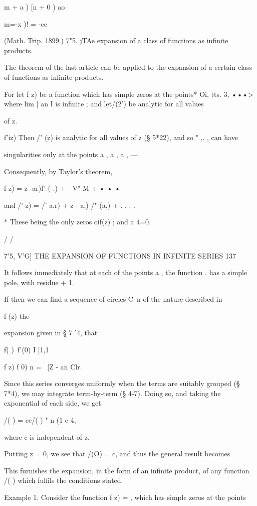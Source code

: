  m + a ) [n + 0 ) ao

m=-x )! = -cc

(Math. Trip. 1899.) 7"5. jTAe expansion of a class of functions as
infinite products.

The theorem of the last article can be applied to the expansion of a
certain class of functions as infinite products.

For let f z) be a function which has simple zeros at the points* Oi,
tts. 3, •••> where lim | an I is infinite ; and let/(2') be analytic
for all values

of z.

f'iz) Then /' (z) is analytic for all values of z (§ 5*22), and so "
,. , can have

singularities only at the points a , a , a , —

Consequently, by Taylor's theorem,

f z) = z- ar)f' ( .) + - V" M + • • •

and /' z) = /' a.r) + z - a,) /" (a,) + . . . .

* These being the only zeros oif(z) ; and a 4=0.

/ /

7'5, V'G] THE EXPANSION OF FUNCTIONS IN INFINITE SERIES 137

It follows immediately that at each of the points a , the function .
has a simple pole, with residue + 1.

If then we can find a sequence of circles C\ n of the nature described
in

f (z) %
the

expansion given in § 7 '4, that

f( )\ f'(0) I [1,1

f z) f 0) n = \ [Z - an Clr.

Since this series converges uniformly when the terms are suitably
grouped (§ 7*4), we may integrate term-by-term (§ 4-7). Doing so, and
taking the exponential of each side, we get

/( ) = ce/( ) " n (1 e 4,

where c is independent of z.

Putting z = 0, we see that /(O) = c, and thus the general result
becomes

This furnishes the expansion, in the form of an infinite product, of
any function /( ) which fulfils the conditions stated.

Example 1. Consider the function f z) = , which has simple zeros at
the points

